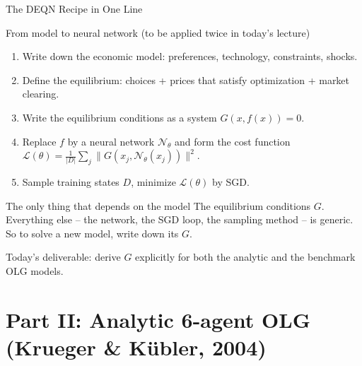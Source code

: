 \documentclass[aspectratio=169,11pt]{beamer}
\newcommand{\emphc}[1]{\textcolor{harvardcrimson}{#1}}
\newcommand{\N}{\mathcal{N}}
\newcommand{\Loss}{\mathcal{L}}
\begin{document}
\begin{frame}{The DEQN Recipe in One Line}
\small
\begin{block}{From model to neural network (to be applied twice in today's lecture)}
\begin{enumerate}\itemsep2pt
    \item Write down the \emphc{economic model}: preferences, technology, constraints, shocks.
    \item Define the \emphc{equilibrium}: choices + prices that satisfy optimization + market clearing.
    \item Write the \emphc{equilibrium conditions} as a system $G(x, f(x)) = 0$.
    \item Replace $f$ by a \emphc{neural network} $\N_\theta$ and form the \emphc{cost function} $\Loss(\theta) = \frac{1}{|D|}\sum_j \|G(x_j, \N_\theta(x_j))\|^2$.
    \item Sample training states $D$, minimize $\Loss(\theta)$ by SGD.
\end{enumerate}
\end{block}

\begin{alertblock}{The only thing that depends on the model}
The \emphc{equilibrium conditions $G$}.  Everything else -- the network, the SGD loop, the sampling method -- is generic.  \emphc{So to solve a new model, write down its $G$.}
\end{alertblock}

\vspace{0.2em}
{\footnotesize Today's deliverable: derive $G$ explicitly for both the analytic and the benchmark OLG models.}
\end{frame}



\section{Part II: Analytic 6-agent OLG (Krueger \& K\"ubler, 2004)}
\end{document}
